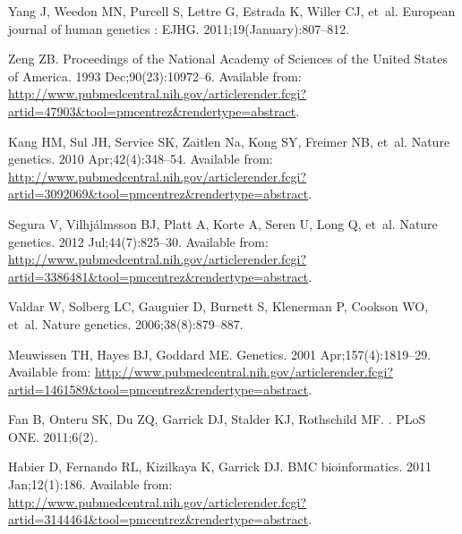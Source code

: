 \documentclass[10pt,letterpaper]{article}
\begin{document}
\begin{thebibliography}{10}
Yang J, Weedon MN, Purcell S, Lettre G, Estrada K, Willer CJ, et~al.
\newblock European journal of human genetics : EJHG. 2011;19(January):807--812.

Zeng ZB.
\newblock Proceedings of the National Academy of Sciences of the United States
  of America. 1993 Dec;90(23):10972--6.
\newblock Available from:
  \url{http://www.pubmedcentral.nih.gov/articlerender.fcgi?artid=47903\&tool=pmcentrez\&rendertype=abstract}.

Kang HM, Sul JH, Service SK, Zaitlen Na, Kong SY, Freimer NB, et~al.
\newblock Nature genetics. 2010 Apr;42(4):348--54.
\newblock Available from:
  \url{http://www.pubmedcentral.nih.gov/articlerender.fcgi?artid=3092069\&tool=pmcentrez\&rendertype=abstract}.

Segura V, Vilhj\'{a}lmsson BJ, Platt A, Korte A, Seren U, Long Q, et~al.
\newblock Nature genetics. 2012 Jul;44(7):825--30.
\newblock Available from:
  \url{http://www.pubmedcentral.nih.gov/articlerender.fcgi?artid=3386481\&tool=pmcentrez\&rendertype=abstract}.

Valdar W, Solberg LC, Gauguier D, Burnett S, Klenerman P, Cookson WO, et~al.
\newblock Nature genetics. 2006;38(8):879--887.

Meuwissen TH, Hayes BJ, Goddard ME.
\newblock Genetics. 2001 Apr;157(4):1819--29.
\newblock Available from:
  \url{http://www.pubmedcentral.nih.gov/articlerender.fcgi?artid=1461589\&tool=pmcentrez\&rendertype=abstract}.

Fan B, Onteru SK, Du ZQ, Garrick DJ, Stalder KJ, Rothschild MF.
.
\newblock PLoS ONE. 2011;6(2).

Habier D, Fernando RL, Kizilkaya K, Garrick DJ.
\newblock BMC bioinformatics. 2011 Jan;12(1):186.
\newblock Available from:
  \url{http://www.pubmedcentral.nih.gov/articlerender.fcgi?artid=3144464\&tool=pmcentrez\&rendertype=abstract}.


\end{thebibliography}
\end{document}
